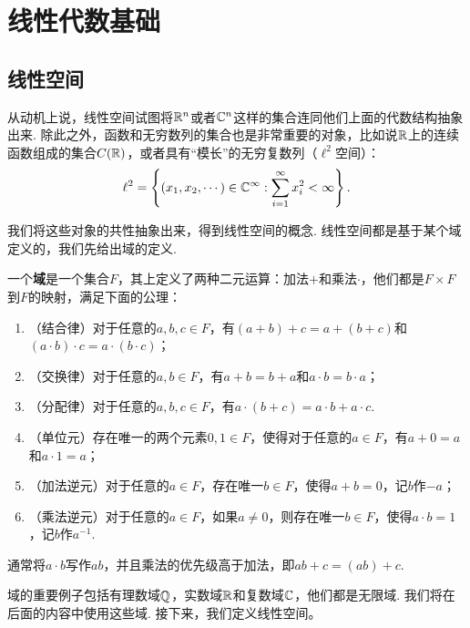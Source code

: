 \chapter{线性代数基础}\label{chap:linear-algebra}

\section{线性空间}

从动机上说，线性空间试图将$\mathbb{R}^n$或者$\mathbb{C}^n$这样的集合连同他们上面的代数结构抽象出来. 除此之外，函数和无穷数列的集合也是非常重要的对象，比如说$\mathbb{R}$上的连续函数组成的集合$C(\mathbb{R})$，或者具有“模长”的无穷复数列（$\ell^2$空间）：
\[\ell^2=\left\{(x_1,x_2,\cdots)\in\mathbb{C}^\infty:\sum_{i=1}^\infty x_i^2<\infty\right\}.\]

我们将这些对象的共性抽象出来，得到线性空间的概念. 线性空间都是基于某个域定义的，我们先给出域的定义. 

\begin{definition}[域]
一个\textbf{域}是一个集合$F$，其上定义了两种二元运算：加法$+$和乘法$\cdot$，他们都是$F\times F$到$F$的映射，满足下面的公理：
\begin{enumerate}
    \item （结合律）对于任意的$a,b,c\in F$，有$(a+b)+c=a+(b+c)$和$(a\cdot b)\cdot c=a\cdot (b\cdot c)$；
    \item （交换律）对于任意的$a,b\in F$，有$a+b=b+a$和$a\cdot b=b\cdot a$；
    \item（分配律）对于任意的$a,b,c\in F$，有$a\cdot(b+c)=a\cdot b+a\cdot c$. 
    \item （单位元）存在唯一的两个元素$0,1\in F$，使得对于任意的$a\in F$，有$a+0=a$和$a\cdot 1=a$；
    \item （加法逆元）对于任意的$a\in F$，存在唯一$b\in F$，使得$a+b=0$，记$b$作$-a$；
    \item （乘法逆元）对于任意的$a\in F$，如果$a\neq 0$，则存在唯一$b\in F$，使得$a\cdot b=1$，记$b$作$a^{-1}$.
\end{enumerate}
通常将$a\cdot b$写作$ab$，并且乘法的优先级高于加法，即$ab+c=(ab)+c$. 
\end{definition}

域的重要例子包括有理数域$\mathbb{Q}$，实数域$\mathbb{R}$和复数域$\mathbb{C}$，他们都是无限域. 我们将在后面的内容中使用这些域. 接下来，我们定义线性空间。

